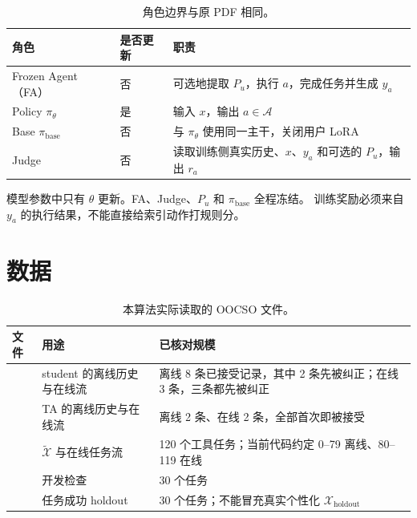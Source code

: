 \documentclass[11pt,UTF8,fontset=none]{ctexart}
\newcommand{\Xholdout}{\mathcal X_{\mathrm{holdout}}}
\newcommand{\Xsim}{\widetilde{\mathcal X}}
\newcommand{\policy}{\pi_{\theta}}
\newcommand{\basepolicy}{\pi_{\mathrm{base}}}
\begin{document}
\begin{table}[ht]
  \centering
  \caption{角色边界与原 PDF 相同。}
  \begin{tabularx}{\textwidth}{@{}L{0.23\textwidth}L{0.15\textwidth}Y@{}}
    \toprule
    角色 & 是否更新 & 职责 \\
    \midrule
    Frozen Agent（FA） &
    否 &
    可选地提取 \(P_u\)，执行 \(a\)，完成任务并生成 \(y_a\) \\
    Policy \(\policy\) &
    是 &
    输入 \(x\)，输出 \(a\in\mathcal A\) \\
    Base \(\basepolicy\) &
    否 &
    与 \(\policy\) 使用同一主干，关闭用户 LoRA \\
    Judge &
    否 &
    读取训练侧真实历史、\(x\)、\(y_a\) 和可选的 \(P_u\)，输出 \(r_a\) \\
    \bottomrule
  \end{tabularx}
\end{table}

模型参数中只有 \(\theta\) 更新。FA、Judge、\(P_u\) 和 \(\basepolicy\) 全程冻结。
训练奖励必须来自 \(y_a\) 的执行结果，不能直接给索引动作打规则分。

\section{数据}



\begin{table}[ht]
  \centering
  \caption{本算法实际读取的 OOCSO 文件。}
  \begin{tabularx}{\textwidth}{@{}L{0.30\textwidth}L{0.22\textwidth}Y@{}}
    \toprule
    文件 & 用途 & 已核对规模 \\
    \midrule
     &
    student 的离线历史与在线流 &
    离线 8 条已接受记录，其中 2 条先被纠正；在线 3 条，三条都先被纠正 \\
     &
    TA 的离线历史与在线流 &
    离线 2 条、在线 2 条，全部首次即被接受 \\
     &
    \(\Xsim\) 与在线任务流 &
    120 个工具任务；当前代码约定 0--79 离线、80--119 在线 \\
     &
    开发检查 &
    30 个任务 \\
     &
    任务成功 holdout &
    30 个任务；不能冒充真实个性化 \(\Xholdout\) \\
    \bottomrule
  \end{tabularx}
\end{table}
\end{document}
